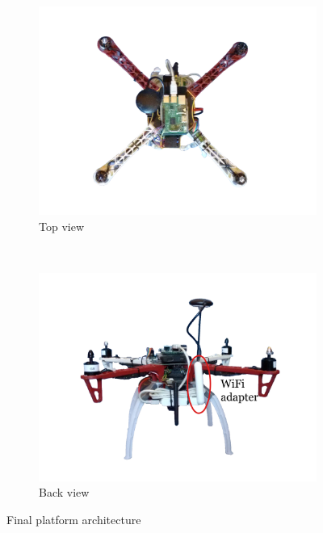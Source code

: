 \begin{figure}[htbp]
	\begin{subfigure}[b]{0.45\textwidth}
		\includegraphics[width=\textwidth]{./figures/f450/top.png}
		\caption{Top view}
	\end{subfigure}
	~
	\begin{subfigure}[b]{0.45\textwidth}
		\includegraphics[width=\textwidth]{./figures/f450/back.png}
		\caption{Back view}
	\end{subfigure}

	\caption{Final platform architecture}
	\label{fig:f450}
\end{figure}
